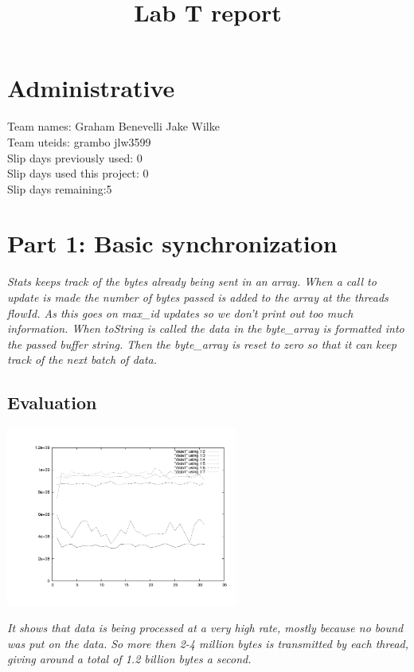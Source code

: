 \documentclass[11pt, letterpaper]{article}
\title{Lab T report}
\begin{document}
\maketitle
\section{Administrative}

Team names: Graham Benevelli Jake Wilke\\
Team uteids: grambo jlw3599\\
Slip days previously used: 0\\
Slip days used this project: 0\\
Slip days remaining:5\\

\section{Part 1: Basic synchronization}

{\em Stats keeps track of the bytes already being sent in an array. When a call to update is made the number of bytes passed is added to the array at the threads flowId. As this goes on max_id updates so we don't print out too much information. When toString is called the data in the byte_array is formatted into the passed buffer string. Then the byte_array is reset to zero so that it can keep track of the next batch of data.}

\subsection{Evaluation}

\centerline{\includegraphics[width=3in]{plot1}}

{\em It shows that data is being processed at a very high rate, mostly because no bound was put on the data. So more then 2-4 million bytes is transmitted by each thread, giving around a total of 1.2 billion bytes a second.}
\end{document}
